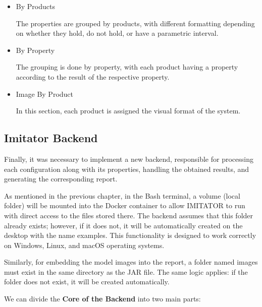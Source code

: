 \begin{itemize}
    \item By Products

    The properties are grouped by products, with different formatting depending on whether they hold, do not hold, or have a parametric interval.

    \item By Property

    The grouping is done by property, with each product having a property according to the result of the respective property.

    \item Image By Product

    In this section, each product is assigned the visual format of the system.
\end{itemize}


\subsection{Imitator Backend}

Finally, it was necessary to implement a new backend, responsible for processing each configuration along with its properties, handling the obtained results, and generating the corresponding report.

As mentioned in the previous chapter, in the Bash terminal, a volume (local folder) will be mounted into the Docker container to allow IMITATOR to run with direct access to the files stored there. The backend assumes that this folder already exists; however, if it does not, it will be automatically created on the desktop with the name examples. This functionality is designed to work correctly on Windows, Linux, and macOS operating systems.

Similarly, for embedding the model images into the report, a folder named images must exist in the same directory as the JAR file. The same logic applies: if the folder does not exist, it will be created automatically.

We can divide the \textbf{Core of the Backend} into two main parts:

